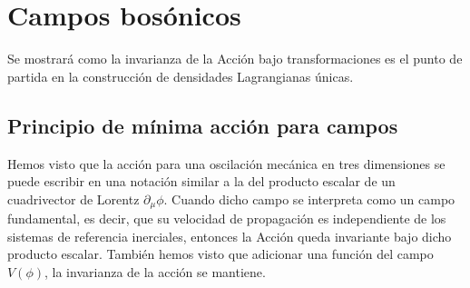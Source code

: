 \chapter{Campos bosónicos}
\label{cha:campos-vectoriales} %

 Se mostrará como la invarianza de la Acción bajo transformaciones es el punto de partida en la construcción de densidades Lagrangianas únicas.


 
\section{Principio de mínima acción para campos}
Hemos visto que la acción para una oscilación mecánica en tres dimensiones se puede escribir en una notación similar a la del producto escalar de un cuadrivector de Lorentz $\partial_\mu\phi$. Cuando dicho campo se interpreta como un campo fundamental, es decir, que su velocidad de propagación es independiente de los sistemas de referencia inerciales, entonces la Acción queda invariante bajo dicho producto escalar. También hemos visto que adicionar una función del campo $V(\phi)$, la invarianza de la acción se mantiene.

